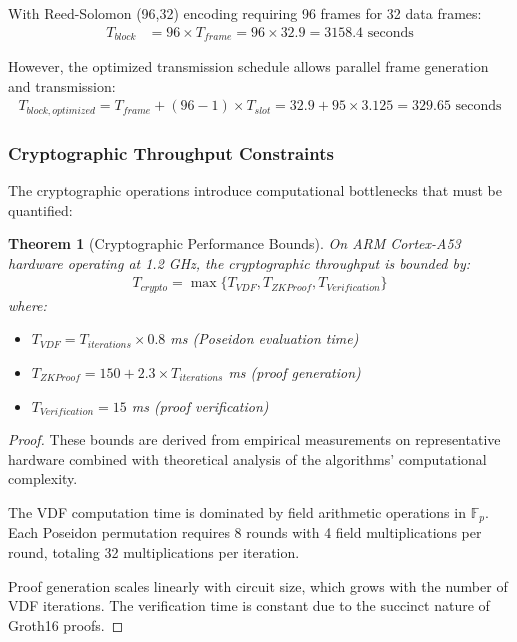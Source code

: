 \documentclass[11pt,a4paper]{article}
\newtheorem{theorem}{Theorem}[section]
\begin{document}
With Reed-Solomon (96,32) encoding requiring 96 frames for 32 data frames:
\begin{align}
T_{block} &= 96 \times T_{frame} = 96 \times 32.9 = 3158.4 \text{ seconds}
\end{align}

However, the optimized transmission schedule allows parallel frame generation and transmission:
\begin{align}
T_{block,optimized} = T_{frame} + (96-1) \times T_{slot} = 32.9 + 95 \times 3.125 = 329.65 \text{ seconds}
\end{align}

\subsubsection{Cryptographic Throughput Constraints}

The cryptographic operations introduce computational bottlenecks that must be quantified:

\begin{theorem}[Cryptographic Performance Bounds]
On ARM Cortex-A53 hardware operating at 1.2 GHz, the cryptographic throughput is bounded by:
\begin{align}
T_{crypto} = \max\{T_{VDF}, T_{ZKProof}, T_{Verification}\}
\end{align}
where:
\begin{itemize}
\item $T_{VDF} = T_{iterations} \times 0.8$ ms (Poseidon evaluation time)
\item $T_{ZKProof} = 150 + 2.3 \times T_{iterations}$ ms (proof generation)
\item $T_{Verification} = 15$ ms (proof verification)
\end{itemize}
\end{theorem}

\begin{proof}
These bounds are derived from empirical measurements on representative hardware combined with theoretical analysis of the algorithms' computational complexity.

The VDF computation time is dominated by field arithmetic operations in $\mathbb{F}_p$. Each Poseidon permutation requires 8 rounds with 4 field multiplications per round, totaling 32 multiplications per iteration.

Proof generation scales linearly with circuit size, which grows with the number of VDF iterations. The verification time is constant due to the succinct nature of Groth16 proofs.
\end{proof}
\end{document}
